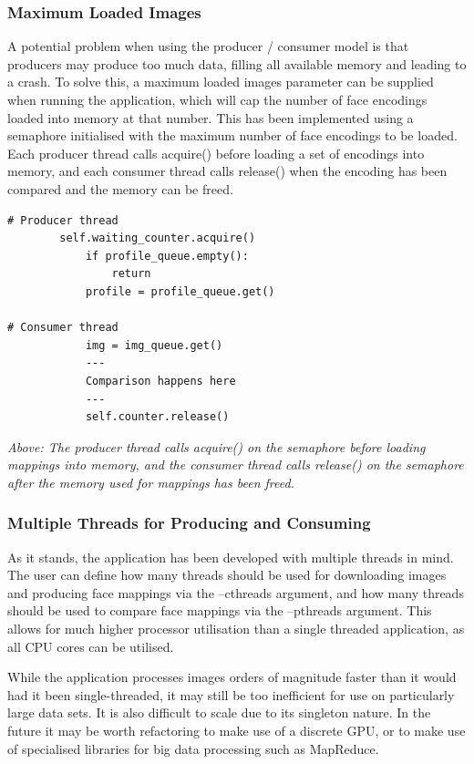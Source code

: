 \documentclass[12pt]{article}
\begin{document}
\subsubsection{Maximum Loaded Images}
A potential problem when using the producer / consumer model is that producers may produce too much data, filling all available memory and leading to a crash. To solve this, a maximum loaded images parameter can be supplied when running the application, which will cap the number of face encodings loaded into memory at that number. This has been implemented using a semaphore initialised with the maximum number of face encodings to be loaded. Each producer thread calls acquire() before loading a set of encodings into memory, and each consumer thread calls release() when the encoding has been compared and the memory can be freed.

\begin{lstlisting}
# Producer thread
		self.waiting_counter.acquire()
            if profile_queue.empty():
                return
            profile = profile_queue.get()
            
# Consumer thread
            img = img_queue.get()
            ---
            Comparison happens here
            ---
			self.counter.release()
\end{lstlisting}
\textit{Above: The producer thread calls acquire() on the semaphore before loading mappings into memory, and the consumer thread calls release() on the semaphore after the memory used for mappings has been freed.}

\subsubsection{Multiple Threads for Producing and Consuming}
As it stands, the application has been developed with multiple threads in mind. The user can define how many threads should be used for downloading images and producing face mappings via the --cthreads argument, and how many threads should be used to compare face mappings via the --pthreads argument. This allows for much higher processor utilisation than a single threaded application, as all CPU cores can be utilised.

While the application processes images orders of magnitude faster than it would had it been single-threaded, it may still be too inefficient for use on particularly large data sets. It is also difficult to scale due to its singleton nature. In the future it may be worth refactoring to make use of a discrete GPU, or to make use of specialised libraries for big data processing such as MapReduce.
\end{document}
